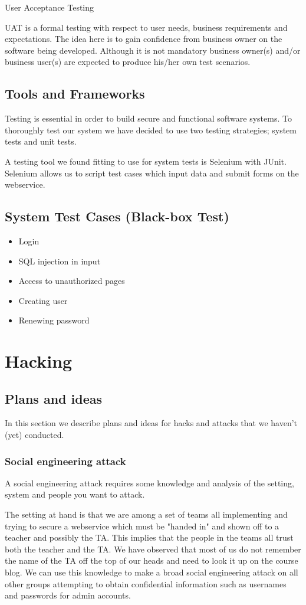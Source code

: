 \documentclass[a4paper]{article}
\begin{document}
User Acceptance Testing 

UAT is a formal testing with respect to user needs, business requirements and expectations.  The idea here is to gain confidence from business owner on the software being developed.  Although it is not mandatory business owner(s) and/or business user(s) are expected to produce his/her own test scenarios.
\subsection{Tools and Frameworks}
Testing is essential in order to build secure and functional software systems. To thoroughly test our system we have decided to use two testing strategies; system tests and unit tests.

A testing tool we found fitting to use for system tests is Selenium with JUnit. Selenium allows us to script test cases which input data and submit forms on the webservice.

\subsection{System Test Cases (Black-box Test)}

\begin{itemize}
\item Login
\item SQL injection in input
\item Access to unauthorized pages
\item Creating user
\item Renewing password
\end{itemize}

\section{Hacking}
\subsection{Plans and ideas}
In this section we describe plans and ideas for hacks and attacks that we haven't (yet) conducted.
\subsubsection{Social engineering attack}
A social engineering attack requires some knowledge and analysis of the setting, system and people you want to attack.

The setting at hand is that we are among a set of teams all implementing and trying to secure a webservice which must be "handed in" and shown off to a teacher and possibly the TA. This implies that the people in the teams all trust both the teacher and the TA. We have observed that most of us do not remember the name of the TA off the top of our heads and need to look it up on the course blog.
We can use this knowledge to make a broad social engineering attack on all other groups attempting to obtain confidential information such as usernames and passwords for admin accounts.
\end{document}
